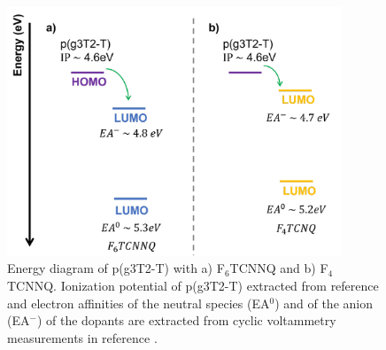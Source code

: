 \begin{figure}
  \centering
  \includegraphics[width=10cm]{Images/pdf/dopingprocess.pdf}
  \caption[Energy diagram of p(g3T2-T) and dopants F$_{6}$TCNNQ and F$_{4}$TCNNQ]{Energy diagram of p(g3T2-T) with a) F$_{6}$TCNNQ and b) F$_{4}$TCNNQ. Ionization potential of p(g3T2-T) extracted from reference \cite{tanTuningOrganicElectrochemical2022} and electron affinities of the neutral species (EA$^{0}$) and of the anion (EA$^{-}$) of the dopants are extracted from cyclic voltammetry measurements in reference \cite{kieferDoubleDopingConjugated2019}.}
  \label{fig:doping}
\end{figure}



